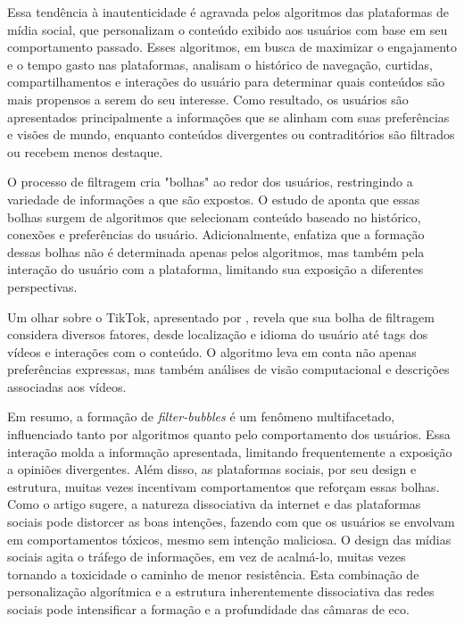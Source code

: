 Essa tendência à inautenticidade é agravada pelos algoritmos das plataformas de mídia social, que personalizam o conteúdo exibido aos usuários com base em seu comportamento passado. Esses algoritmos, em busca de maximizar o engajamento e o tempo gasto nas plataformas, analisam o histórico de navegação, curtidas, compartilhamentos e interações do usuário para determinar quais conteúdos são mais propensos a serem do seu interesse. Como resultado, os usuários são apresentados principalmente a informações que se alinham com suas preferências e visões de mundo, enquanto conteúdos divergentes ou contraditórios são filtrados ou recebem menos destaque.

O processo de filtragem cria "bolhas" ao redor dos usuários, restringindo a variedade de informações a que são expostos. O estudo de  aponta que essas bolhas surgem de algoritmos que selecionam conteúdo baseado no histórico, conexões e preferências do usuário. Adicionalmente,  enfatiza que a formação dessas bolhas não é determinada apenas pelos algoritmos, mas também pela interação do usuário com a plataforma, limitando sua exposição a diferentes perspectivas.

Um olhar sobre o TikTok, apresentado por , revela que sua bolha de filtragem considera diversos fatores, desde localização e idioma do usuário até tags dos vídeos e interações com o conteúdo. O algoritmo leva em conta não apenas preferências expressas, mas também análises de visão computacional e descrições associadas aos vídeos.

Em resumo, a formação de \textit{filter-bubbles} é um fenômeno multifacetado, influenciado tanto por algoritmos quanto pelo comportamento dos usuários. Essa interação molda a informação apresentada, limitando frequentemente a exposição a opiniões divergentes. Além disso, as plataformas sociais, por seu design e estrutura, muitas vezes incentivam comportamentos que reforçam essas bolhas. Como o artigo  sugere, a natureza dissociativa da internet e das plataformas sociais pode distorcer as boas intenções, fazendo com que os usuários se envolvam em comportamentos tóxicos, mesmo sem intenção maliciosa. O design das mídias sociais agita o tráfego de informações, em vez de acalmá-lo, muitas vezes tornando a toxicidade o caminho de menor resistência. Esta combinação de personalização algorítmica e a estrutura inherentemente dissociativa das redes sociais pode intensificar a formação e a profundidade das câmaras de eco.

